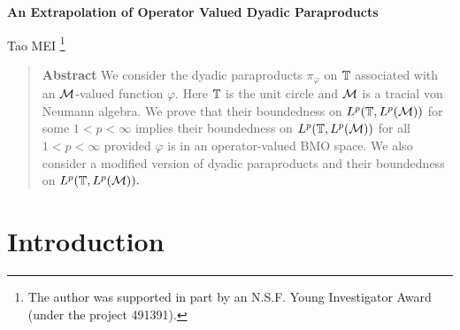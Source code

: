 \renewcommand{\e}{\varepsilon}
\newcommand{\f}{\varphi}
\renewcommand{\O}{{\Omega}}
\renewcommand{\o}{{\omega}}
\newcommand{\s}{\sigma}
\newcommand{\be}{\begin{eqnarray*}}
\newcommand{\ee}{\end{eqnarray*}}
\newcommand{\beq}{\begin{equation}}
\newcommand{\eeq}{\end{equation}}
\newcommand{\dis}{\displaystyle}
\setlength{\oddsidemargin}{0in}
\setlength{\evensidemargin}{0in}
\setlength{\textwidth}{15.5cm}
\setlength{\textheight}{22cm}
\setlength{\topmargin}{-1cm}
\def\dfrac{\displaystyle\frac}
\def\dint{\displaystyle\int}
\def\dsum{\displaystyle\sum}
\def\iint{\mathop{\displaystyle\int\!\!\!\int}}
\def\text{\mbox}
\def\triangleq{{\triangle \atop =}}



\begin{center}
\mathstrut

{\Large {\bf An Extrapolation of Operator Valued Dyadic Paraproducts}}

\medskip

Tao MEI \footnote{%
The author was supported in part by an N.S.F. Young Investigator
Award (under the project 491391).}
\end{center}

\begin{quotation}
{\bf Abstract } We consider the dyadic paraproducts $\pi _\f$ on
${\mathbb T}$ associated with an ${\mathcal M}$-valued function $\f.$  Here ${\mathbb T}$ is the
unit circle and ${\mathcal M}$ is a tracial von Neumann algebra. We prove that
their boundedness on $L^p({\mathbb T},L^p({\mathcal M}))$ for some $1<p<\infty $
implies their boundedness on $L^p({\mathbb T},L^p({\mathcal M}))$ for all $1<p<\infty$
provided $\f$ is in an operator-valued BMO space. We also consider a
modified version of dyadic paraproducts and their boundedness on
$L^p({\mathbb T},L^p({\mathcal M})).$
\end{quotation}

\section{Introduction}

\setcounter{theorem}{0}\setcounter{equation}{0}

